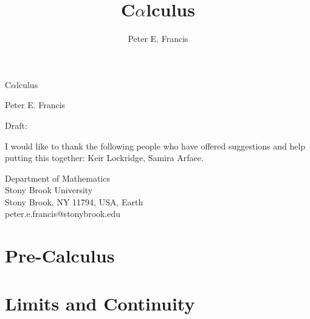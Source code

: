 \documentclass{article}
\title{C$\alpha$lculus}
\author{Peter E. Francis}
\theoremstyle{definition}
\theoremstyle{definition}
\begin{document}
\thispagestyle{empty}

\vspace*{2in}

\begin{Huge}
\noindent C$\alpha$lculus
\end{Huge}

\vspace*{1em}

\noindent Peter E. Francis

\vspace*{5em}

\begin{footnotesize}
\noindent Draft: \DTMnow
\end{footnotesize}

\vfill

\begin{small}
\noindent I would like to thank the following people who have offered suggestions and help putting this together: Keir Lockridge, Samira Arfaee.
\end{small}

\vfill

\noindent Department of Mathematics \\
Stony Brook University\\
Stony Brook, NY 11794, USA, Earth\\

\noindent peter.e.francis@stonybrook.edu

\newpage

\tableofcontents

\newpage




\newpage
\part{Pre-Calculus}

\newpage



\newpage
\part{Limits and Continuity}

% 
% 
\end{document}
